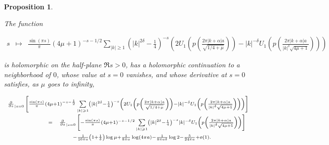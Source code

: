 \documentclass{jams-l}
\newtheorem{proposition}[theorem]{Proposition}
\theoremstyle{definition}
\theoremstyle{remark}
\numberwithin{equation}{section}
\begin{document}
            \begin{proposition}
            \label{PropA6and10}
            
                The function
                
                \[ \begin{array}{lll}
                        \scriptstyle s & \scriptstyle \mapsto & \scriptstyle \frac{\sin \left(\pi s \right)}{\pi} \left( 4 \mu + 1 \right)^{-s-1/2} \sum\limits_{\left \vert k \right \vert \geqslant 1} \left( \left \vert k \right \vert^{2 \delta} - \frac{1}{4} \right)^{-s} \left( 2U_1 \left( p \left( \frac{2 \pi \left \vert k + \alpha \right \vert a}{\sqrt{1/4 + \mu}} \right) \right) - \left \vert k \right \vert^{-\delta} U_1 \left( p \left( \frac{2 \pi \left \vert k + \alpha \right \vert a}{\left \vert k \right \vert^{\delta} \sqrt{4 \mu + 1}} \right) \right) \right)
                    \end{array} \]
                
                \noindent is holomorphic on the half-plane $\Re s > 0$, has a holomorphic continuation to a neighborhood of $0$, whose value at $s=0$ vanishes, and whose derivative at $s=0$ satisfies, as $\mu$ goes to infinity,
                
                \[ \begin{array}{lll}
                        \multicolumn{3}{l}{\scriptstyle \frac{\partial}{\partial s}_{\left \vert s = 0 \right.} \left[ \frac{\sin \left(\pi s \right)}{\pi} \left( 4 \mu + 1 \right)^{-s-\frac{1}{2}} \sum\limits_{\left \vert k \right \vert \geqslant 1} \left( \left \vert k \right \vert^{2 \delta} - \frac{1}{4} \right)^{-s} \left( 2U_1 \left( p \left( \frac{2 \pi \left \vert k + \alpha \right \vert a}{\sqrt{1/4 + \mu}} \right) \right) - \left \vert k \right \vert^{-\delta} U_1 \left( p \left( \frac{2 \pi \left \vert k + \alpha \right \vert a}{\left \vert k \right \vert^{\delta} \sqrt{4 \mu + 1}} \right) \right) \right) \right]} \\[1em]
                        
                        \scriptstyle \qquad \qquad \quad & \scriptstyle = & \scriptstyle \frac{\partial}{\partial s}_{\left \vert s = 0 \right.} \left[ - \frac{\sin \left( \pi s \right)}{\pi} \left( 4 \mu + 1 \right)^{-s-1/2} \sum\limits_{\left \vert k \right \vert \geqslant 1} \left( \left \vert k \right \vert^{2 \delta} - \frac{1}{4} \right)^{-s} \left \vert k \right \vert^{- \delta} U_1 \left( p \left( \frac{2 \pi \left \vert k + \alpha \right \vert a}{\left \vert k \right \vert^{\delta} \sqrt{4 \mu + 1}} \right) \right) \right] \\[1em]
                        
                        && \scriptstyle \qquad - \frac{1}{16 \pi a} \left( 1 + \frac{1}{\delta} \right) \log \mu + \frac{1}{8 \pi a} \log \left( 4 \pi a \right) - \frac{1}{8 \pi a \delta} \log 2 - \frac{5}{24 \pi a} + o \left( 1 \right).
                    \end{array} \]
                
            \end{proposition}
            
\end{document}

